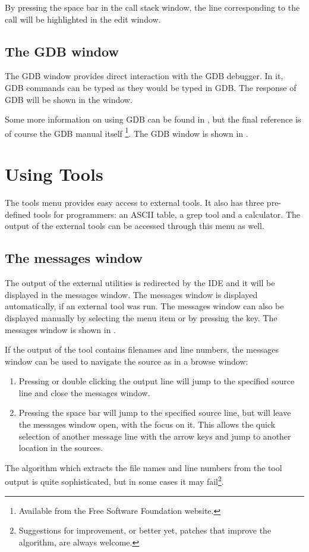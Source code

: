 By pressing the space bar in the call stack window, the line corresponding
to the call will be highlighted in the edit window.

\subsection{The GDB window}
\label{se:gdbwindow}
The GDB window provides direct interaction with the GDB debugger.
In it, GDB commands can be typed as they would be typed in GDB.
The response of GDB will be shown in the window.

Some more information on using GDB can be found in , but
the final reference is of course the GDB manual itself
\footnote{Available from the Free Software Foundation website.}.
The GDB window is shown in .


\section{Using Tools}
\label{se:toolsmenu}
The tools menu provides easy access to external tools. It also has
three pre-defined tools for programmers: an ASCII table, a grep tool
and a calculator. The output of the external tools can be accessed through
this menu as well.

%
%
\subsection{The messages window}
\label{se:toolsmessages}
The output of the external utilities is redirected by the IDE and it
will be displayed in the messages window. The messages window is
displayed automatically, if an external tool was run. The
messages window can also be displayed manually by selecting the
menu item  or by pressing the  key.
The messages window is shown in .


If the output of the tool contains filenames and line numbers,
the messages window can be used to navigate the source as in a browse
window:
\begin{enumerate}
\item Pressing  or double clicking the output line will jump
to the specified source line and close the messages window.
\item Pressing the space bar will jump to the specified source line, but
will leave the messages window open, with the focus on it. This allows the
quick selection of another message line with the arrow keys and jump to
another location in the sources.
\end{enumerate}
The algorithm which extracts the file names and line numbers from
the tool output is quite sophisticated, but in some cases it may
fail\footnote{Suggestions for improvement, or better yet, patches
that improve the algorithm, are always welcome.}.
%
%
